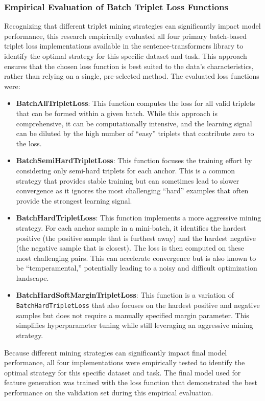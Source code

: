 \subsubsection{Empirical Evaluation of Batch Triplet Loss Functions}
Recognizing that different triplet mining strategies can significantly impact model performance, this research empirically evaluated all four primary batch-based triplet loss implementations available in the sentence-transformers library to identify the optimal strategy for this specific dataset and task. This approach ensures that the chosen loss function is best suited to the data's characteristics, rather than relying on a single, pre-selected method. The evaluated loss functions were:
\begin{itemize}
    \item \textbf{BatchAllTripletLoss}: This function computes the loss for all valid triplets that can be formed within a given batch. While this approach is comprehensive, it can be computationally intensive, and the learning signal can be diluted by the high number of ``easy'' triplets that contribute zero to the loss.
    \item \textbf{BatchSemiHardTripletLoss}: This function focuses the training effort by considering only semi-hard triplets for each anchor. This is a common strategy that provides stable training but can sometimes lead to slower convergence as it ignores the most challenging ``hard'' examples that often provide the strongest learning signal.
    \item \textbf{BatchHardTripletLoss}: This function implements a more aggressive mining strategy. For each anchor sample in a mini-batch, it identifies the hardest positive (the positive sample that is furthest away) and the hardest negative (the negative sample that is closest). The loss is then computed on these most challenging pairs. This can accelerate convergence but is also known to be ``temperamental,'' potentially leading to a noisy and difficult optimization landscape.
    \item \textbf{BatchHardSoftMarginTripletLoss}: This function is a variation of \verb|BatchHardTripletLoss| that also focuses on the hardest positive and negative samples but does not require a manually specified margin parameter. This simplifies hyperparameter tuning while still leveraging an aggressive mining strategy.
\end{itemize}
Because different mining strategies can significantly impact final model performance, all four implementations were empirically tested to identify the optimal strategy for this specific dataset and task. The final model used for feature generation was trained with the loss function that demonstrated the best performance on the validation set during this empirical evaluation.

